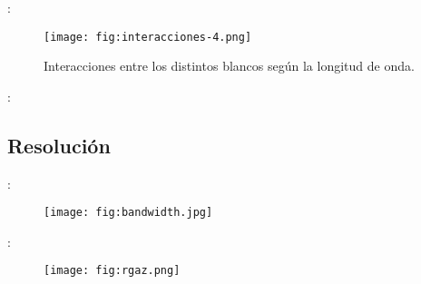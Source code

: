 \begin{frame}{\secname : \subsecname}
    \begin{figure}
      \centering
      \texttt{[image: fig:interacciones-4.png]}
      \caption{Interacciones entre los distintos blancos según la longitud de onda.}
      \label{}
    \end{figure}
\end{frame}


\begin{frame}{\secname : \subsecname}
    \begin{figure}
    \centering
    \hspace{1cm}
    \hspace{1cm}
    \end{figure}
\end{frame}

\subsection{Resolución}
\begin{frame}{\secname : \subsecname}
    \begin{figure}
      \centering
      \texttt{[image: fig:bandwidth.jpg]}
      \caption{}
      \label{}
    \end{figure}
\end{frame}


\begin{frame}{\secname : \subsecname}
    \begin{figure}
      \centering
      \texttt{[image: fig:rgaz.png]}
      \caption{}
      \label{}
    \end{figure}
\end{frame}

